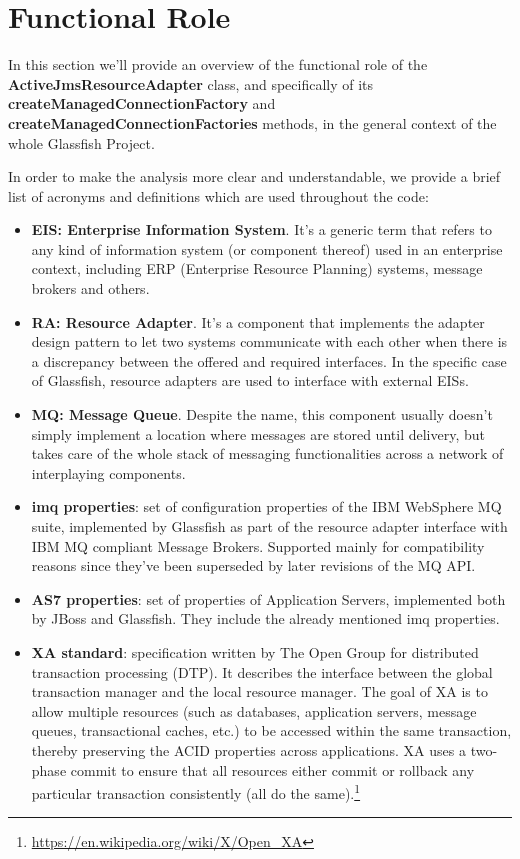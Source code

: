 \chapter{Functional Role}
In this section we'll provide an overview of the functional role of the \textbf{ActiveJmsResourceAdapter} class, and specifically of its \textbf{createManagedConnectionFactory} and \textbf{createManagedConnectionFactories} methods, in the general context of the whole Glassfish Project.

In order to make the analysis more clear and understandable, we provide a brief list of acronyms and definitions which are used throughout the code:
\begin{itemize}
	\item \textbf{EIS: Enterprise Information System}. It's a generic term that refers to any kind of information system (or component thereof) used in an enterprise context, including ERP (Enterprise Resource Planning) systems, message brokers and others.
	\item \textbf{RA: Resource Adapter}. It's a component that implements the adapter design pattern to let two systems communicate with each other when there is a discrepancy between the offered and required interfaces. In the specific case of Glassfish, resource adapters are used to interface with external EISs.
	\item \textbf{MQ: Message Queue}. Despite the name, this component usually doesn't simply implement a location where messages are stored until delivery, but takes care of the whole stack of messaging functionalities across a network of interplaying components. 
	\item \textbf{imq properties}: set of configuration properties of the IBM WebSphere MQ suite, implemented by Glassfish as part of the resource adapter interface with IBM MQ compliant Message Brokers. Supported mainly for compatibility reasons since they've been superseded by later revisions of the MQ API. 
	\item \textbf{AS7 properties}: set of properties of Application Servers, implemented both by JBoss and Glassfish. They include the already mentioned imq properties. 
	\item \textbf{XA standard}: specification written by The Open Group for distributed transaction processing (DTP). It describes the interface between the global transaction manager and the local resource manager. The goal of XA is to allow multiple resources (such as databases, application servers, message queues, transactional caches, etc.) to be accessed within the same transaction, thereby preserving the ACID properties across applications. XA uses a two-phase commit to ensure that all resources either commit or rollback any particular transaction consistently (all do the same).\footnote{\url{https://en.wikipedia.org/wiki/X/Open_XA}}

\end{itemize}
